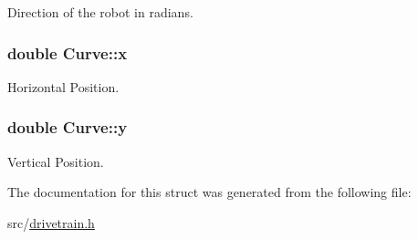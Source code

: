 Direction of the robot in radians. 

\subsubsection[{\texorpdfstring{x}{x}}]{\setlength{\rightskip}{0pt plus 5cm}double Curve\+::x}\hypertarget{structCurve_a5d3af6bf8552bed573d4f3a1eeb70bd5}{}\label{structCurve_a5d3af6bf8552bed573d4f3a1eeb70bd5}


Horizontal Position. 

\subsubsection[{\texorpdfstring{y}{y}}]{\setlength{\rightskip}{0pt plus 5cm}double Curve\+::y}\hypertarget{structCurve_aabe742a202fc35bf2d30d24de017f62b}{}\label{structCurve_aabe742a202fc35bf2d30d24de017f62b}


Vertical Position. 



The documentation for this struct was generated from the following file\+:\begin{DoxyCompactItemize}
\item 
src/\hyperlink{drivetrain_8h}{drivetrain.\+h}\end{DoxyCompactItemize}
